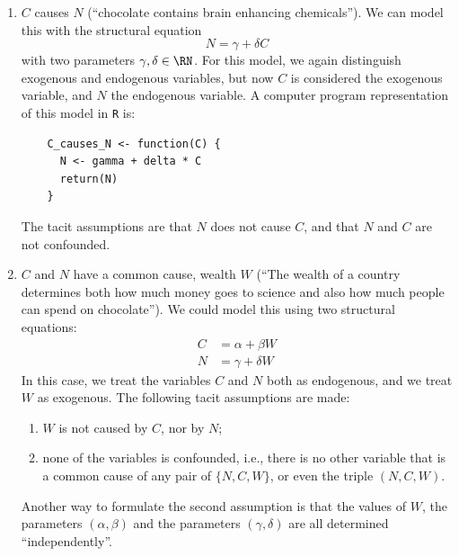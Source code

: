 \begin{enumerate}[label=(\roman*)]
    One concrete way to think about the model (and a very useful analogy) is as a small computer program, for example in the language \texttt{R}:
    \begin{lstlisting}
    N_causes_C <- function(N) {
      C <- alpha + beta * N
      return(C)
    }
    \end{lstlisting}
    The function takes the value of exogenous variable $N$ as input, applies the structural equation  to calculate the value of endogenous variable $C$, and returns that as its output. The variable $N$ is ``exogenous'' to the function (its value is set externally), while $C$ is ``endogenous'' (its value is set internally).
The computer program analogy also shows that changing the value of $C$ by adapting the code inside the function body does not lead to a change in $N$.
  \item $C$ causes $N$ (``chocolate contains brain enhancing chemicals''). 
    We can model this with the structural equation
    \begin{equation}\label{eq:scm_C_causes_N}
    N = \gamma + \delta C
    \end{equation}
    with two parameters $\gamma,\delta \in \RN$.
    For this model, we again distinguish exogenous and endogenous variables, 
    but now $C$ is considered the exogenous variable, and $N$ the endogenous variable.
    A computer program representation of this model in \texttt{R} is:
    \begin{lstlisting}
    C_causes_N <- function(C) {
      N <- gamma + delta * C
      return(N)
    }
    \end{lstlisting}
    The tacit assumptions are that $N$ does not cause $C$, and that $N$ and $C$ are not confounded.
  \item $C$ and $N$ have a common cause, wealth $W$ (``The wealth of a country determines both how much money goes to science and also how much people can spend on chocolate'').
    We could model this using two structural equations:
    \begin{align}\label{eq:scm_W_causes_C_and_N}
      C &= \alpha + \beta W \\
      N &= \gamma + \delta W
    \end{align} 
    In this case, we treat the variables $C$ and $N$ both as endogenous, and we treat $W$ as exogenous.
    The following tacit assumptions are made:
    \begin{enumerate}[label=\arabic*)]
      \item $W$ is not caused by $C$, nor by $N$;
      \item none of the variables is confounded, i.e., there is no other variable that is a common cause of any pair of $\{N,C,W\}$, or even the triple $(N,C,W)$.
    \end{enumerate}
    Another way to formulate the second assumption is that the values of $W$, the parameters $(\alpha,\beta)$ and the parameters $(\gamma,\delta)$ are all determined ``independently''.


\end{enumerate}
